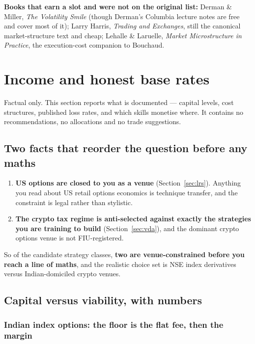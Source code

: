 \documentclass[11pt,a4paper]{article}
\begin{document}
\textbf{Books that earn a slot and were not on the original list:} Derman \&
Miller, \emph{The Volatility Smile} (though Derman's Columbia lecture notes are free
and cover most of it); Larry Harris, \emph{Trading and Exchanges}, still the
canonical market-structure text and cheap; Lehalle \& Laruelle, \emph{Market
Microstructure in Practice}, the execution-cost companion to Bouchaud.

\newpage
\section{Income and honest base rates}
\label{sec:income}

Factual only. This section reports what is documented --- capital levels, cost
structures, published loss rates, and which skills monetise where. It contains no
recommendations, no allocations and no trade suggestions.

\subsection{Two facts that reorder the question before any maths}

\begin{enumerate}
\item \textbf{US options are closed to you as a venue} (Section~\ref{sec:lrs}).
Anything you read about US retail options economics is technique transfer, and the
constraint is legal rather than stylistic.
\item \textbf{The crypto tax regime is anti-selected against exactly the strategies
you are training to build} (Section~\ref{sec:vda}), and the dominant crypto options
venue is not FIU-registered.
\end{enumerate}

So of the candidate strategy classes, \textbf{two are venue-constrained before you
reach a line of maths}, and the realistic choice set is NSE index derivatives
versus Indian-domiciled crypto venues.

\subsection{Capital versus viability, with numbers}

\subsubsection{Indian index options: the floor is the flat fee, then the margin}
\end{document}
